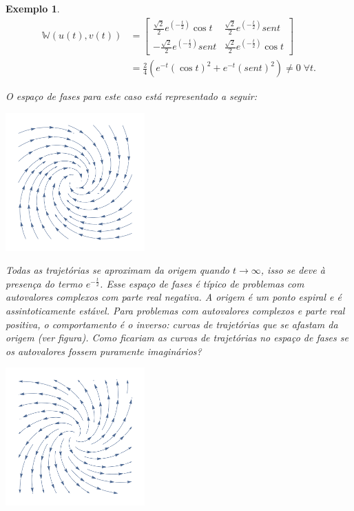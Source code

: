 \documentclass[a4paper,portuguese,9pt,final]{extarticle}
\newtheorem{example}{Exemplo}[section]
\providecommand{\sin}{} \renewcommand{\sin}{sen}
\begin{document}
\begin{multicols*}{2}
\begin{example}
                \begin{equation*}
                    \begin{split}
                        \mathbb{W}(u(t), v(t)) &= \begin{bmatrix} \frac{\sqrt{2}}{2}e^{(-\frac{t}{2})}\cos{t} & \frac{\sqrt{2}}{2}e^{(-\frac{t}{2})}\sin{t} \\ -\frac{\sqrt{2}}{2}e^{(-\frac{t}{2})}\sin{t}& \frac{\sqrt{2}}{2}e^{(-\frac{t}{2})}\cos{t}\end{bmatrix} \\
                        &= \frac{2}{4}(e^{-t}(\cos{t})^2 + e^{-t}(\sin{t})^2) \neq 0 \; \forall t.    
                    \end{split}
                \end{equation*}
                
                O espaço de fases para este caso está representado a seguir:
                
                \includegraphics[width=0.4\textwidth]{fase_3}
                
                Todas as trajetórias se aproximam da origem quando $t\rightarrow \infty$, isso se deve à presença do termo $e^{-\frac{t}{2}}$. Esse espaço de fases é típico de problemas com autovalores complexos com parte real negativa. A origem é um ponto espiral e é assintoticamente estável. Para problemas com autovalores complexos e parte real positiva, o comportamento é o inverso: curvas de trajetórias que se afastam da origem (ver figura). Como ficariam as curvas de trajetórias no espaço de fases se os autovalores fossem puramente imaginários?
                
               
                
                \includegraphics[width=0.4\textwidth]{fase_4}
                

\end{example}
\end{multicols*}
\end{document}
